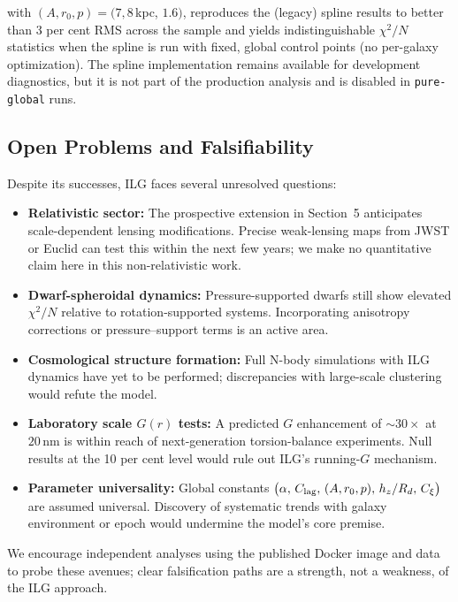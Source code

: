 \documentclass[usenatbib]{mnras}
\begin{document}
with $(A, r_0, p) = (7, 8$\,kpc, $1.6)$, reproduces the (legacy) spline results to better than 3 per cent RMS across the sample and yields indistinguishable $\chi^2/N$ statistics when the spline is run with fixed, global control points (no per-galaxy optimization).  The spline implementation remains available for development diagnostics, but it is not part of the production analysis and is disabled in \texttt{pure-global} runs.


\subsection{Open Problems and Falsifiability}

Despite its successes, ILG faces several unresolved questions:

\begin{itemize}
  \item \textbf{Relativistic sector:} The prospective extension in Section~5 anticipates scale-dependent lensing modifications. Precise weak-lensing maps from JWST or Euclid can test this within the next few years; we make no quantitative claim here in this non-relativistic work.
  \item \textbf{Dwarf-spheroidal dynamics:} Pressure-supported dwarfs still show elevated $\chi^2/N$ relative to rotation-supported systems.  Incorporating anisotropy corrections or pressure–support terms is an active area.
  \item \textbf{Cosmological structure formation:} Full N-body simulations with ILG dynamics have yet to be performed; discrepancies with large-scale clustering would refute the model.
  \item \textbf{Laboratory scale $G(r)$ tests:} A predicted $G$ enhancement of $\sim 30\times$ at $20$\,nm is within reach of next-generation torsion-balance experiments.  Null results at the 10 per cent level would rule out ILG's running-$G$ mechanism.
  \item \textbf{Parameter universality:} Global constants $\big(\alpha,\,C_{\rm lag},\,(A,r_0,p),\,h_z/R_d,\,C_\xi\big)$ are assumed universal. Discovery of systematic trends with galaxy environment or epoch would undermine the model's core premise.
\end{itemize}

We encourage independent analyses using the published Docker image and data to probe these avenues; clear falsification paths are a strength, not a weakness, of the ILG approach.
\end{document}
